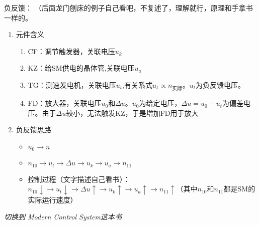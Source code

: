 \documentclass{NHNotebook}
\begin{document}
负反馈：
（后面龙门刨床的例子自己看吧，不复述了，理解就行，原理和手拿书一样的。
\begin{enumerate}
    \item 元件含义
    \begin{enumerate}
        \item CF：调节触发器，关联电压$u_k$
        \item KZ：给SM供电的晶体管,关联电压$u_a$
        \item TG：测速发电机，关联电压$u_t$,有关系式$u_t\propto n_{实际}$。$u_t$为负反馈电压。
        \item FD：放大器，关联电压$u_0$和$\Delta u$。$u_0$为给定电压，$\Delta u = u_0 - u_t$为偏差电压。由于$\Delta u$较小，无法触发KZ，于是增加FD用于放大
    \end{enumerate}
    \item 负反馈思路
    \begin{itemize}
        \item $u_0 \to n$
        \item $n_{10} \to u_t \to \Delta u \to u_k \to u_a \to n_{11}$
        \item 控制过程（文字描述自己看书）：$n_{10}\downarrow \to u_t\downarrow \to \Delta u\uparrow \to u_k\uparrow \to u_a\uparrow \to n_{11}\uparrow$（其中$n_{10}$和$n_{11}$都是SM的实际运行速度）
    \end{itemize}
\end{enumerate}




\emph{切换到 Modern Control System这本书}





\backmatter
\end{document}
